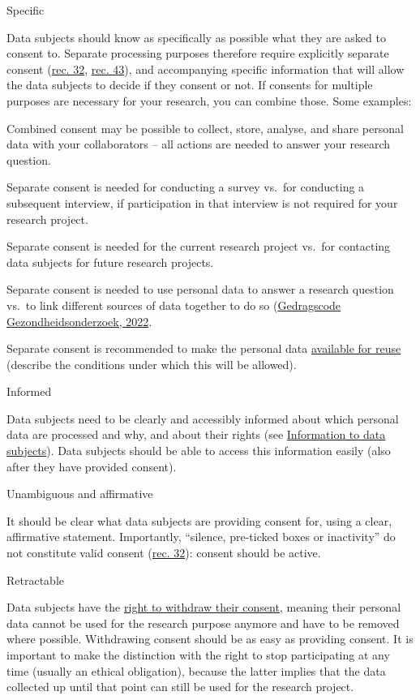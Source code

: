 \documentclass[
]{book}
\begin{document}
Specific

Data subjects should know as specifically as possible what they are asked to
consent to. Separate processing purposes therefore require explicitly separate
consent (\href{https://gdpr-info.eu/recitals/no-32/}{rec. 32},
\href{https://gdpr-info.eu/recitals/no-43/}{rec. 43}), and
accompanying specific information that will allow the data subjects to decide
if they consent or not. If consents for multiple purposes are necessary for your
research, you can combine those.
Some examples:

Combined consent may be possible to collect, store, analyse, and share
personal data with your collaborators -- all actions are needed to answer your
research question.

Separate consent is needed for conducting a survey vs.~for conducting a
subsequent interview, if participation in that interview is not required for
your research project.

Separate consent is needed for the current research project vs.~for contacting
data subjects for future research projects.

Separate consent is needed to use personal data to answer a research question
vs.~to link different sources of data together to do so
(\href{https://www.coreon.org/wp-content/uploads/2022/01/Gedragscode-Gezondheidsonderzoek-2022.pdf}{Gedragscode Gezondheidsonderzoek, 2022}.

Separate consent is recommended to make the personal data
\protect\hyperlink{data-sharing-reuse}{available for reuse} (describe the
conditions under which this will be allowed).

Informed

Data subjects need to be clearly and accessibly informed about which personal
data are processed and why, and about their rights (see
\protect\hyperlink{privacy-notices}{Information to data subjects}). Data subjects should be
able to access this information easily (also after they have provided
consent).

Unambiguous and affirmative

It should be clear what data subjects are providing consent for, using
a clear, affirmative statement. Importantly, ``silence, pre-ticked boxes or
inactivity'' do not constitute valid consent
(\href{https://gdpr-info.eu/recitals/no-32/}{rec. 32}):
consent should be active.

Retractable

Data subjects have the
\protect\hyperlink{data-subject-rights}{right to withdraw their consent}, meaning
their personal data cannot be used for the research purpose anymore and have to
be removed where possible. Withdrawing consent should be as easy as providing
consent. It is important to make the distinction with the right to stop
participating at any time (usually an ethical obligation), because the latter
implies that the data collected up until that point can still be used for the
research project.
\end{document}

